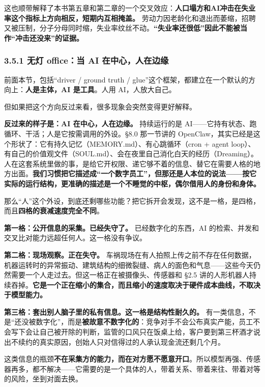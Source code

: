 \documentclass[11pt,a4paper]{ctexart}
\begin{document}
这也顺带解释了本书第五章和第二章的一个交叉效应：\textbf{人口塌方和AI冲击在失业率这个指标上方向相反，短期内互相掩盖。} 劳动力因老龄化和退出而萎缩，招聘又被压制，分子分母同时缩，失业率纹丝不动。\textbf{“失业率还很低”因此不能被当作“冲击还没来”的证据。}

\subsubsection{3.5.1 无灯 office：当 AI 在中心，人在边缘}

前面本节，包括“driver / ground truth / glue”这个框架，都建立在一个默认的方向上：\textbf{人是主体，AI 是工具}。人用 AI，人放大自己。

但如果把这个方向反过来看，很多现象会突然变得更好解释。

\textbf{反过来的样子是：AI 在中心，人在边缘。} 持续运行的是 AI——它持有状态、跑循环、干活；人是它按需调用的外设。\S{}8.0 那一节讲的 OpenClaw，其实已经是这个形状了：它有持久记忆（MEMORY.md）、有心跳循环（cron + agent loop）、有自己的价值观文件（SOUL.md）、会在夜里自己消化白天的经历（Dreaming）。人在这套系统里做的事，是给它开权限、递它够不着的信息、替它在需要人格的地方出面。\textbf{我们习惯把它描述成“一个数字员工”，但那还是人本位的说法——按它实际的运行结构，更准确的描述是一个不睡觉的中枢，偶尔借用人的身份和身体。}

那么“人”这个外设，到底还剩哪些功能？把它拆开会发现，这不是一格，是四格，而且\textbf{四格的衰减速度完全不同}。

\textbf{第一格：公开信息的采集。已经失守了。} 已经数字化的东西，AI 的检索、并发和交叉比对能力远超任何人。这一格没有争议。

\textbf{第二格：现场观察。正在失守。} 车祸现场在有人拍照上传之前不存在任何数据，机器运转时的异常振动、建筑结构的细微裂缝、病人的面色和气息——这些今天仍然需要一个人走过去。但这一格正在被摄像头、传感器和 \S{}2.5 讲的人形机器人持续吞掉。\textbf{它是一个正在缩小的集合，而且缩小的速度取决于硬件成本曲线，不取决于模型能力。}

\textbf{第三格：套出别人脑子里的私有信息。这一格是结构性耐久的。} 有一类信息，不是“还没被数字化”，而是\textbf{被故意不数字化的}：竞争对手不会公布真实产能，员工不会写下会让自己被开除的判断，监管的口风只在饭桌上给，客户要到第三杯酒才说出不续约的真实原因，创始人只对信得过的人承认现金流还剩几个月。

这类信息的瓶颈\textbf{不在采集方的能力，而在对方愿不愿意开口}。所以模型再强、传感器再多，都不解决——它需要的是一个具体的人，带着关系、带着来往、带着对等的风险，坐到对面去换。
\end{document}
